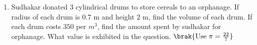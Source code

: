 \begin{enumerate}
\item Sudhakar donated $3$ cylindrical drums to store cereals to an orphanage. If radius of each drum is $0.7$ m and height $2$ m, find the volume of each drum. If each drum costs \rupee $350$ per $m^{3}$, find the amount spent by sudhakar for orphanage. What value is exhibited in the question.  $\brak{\text{Use }\pi = \frac{22}{7}}$
\end{enumerate}
